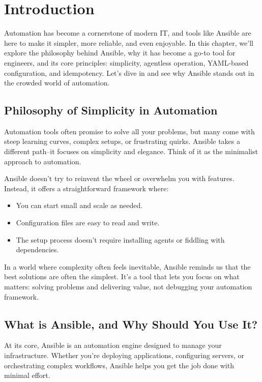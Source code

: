 \chapter{Introduction}

Automation has become a cornerstone of modern IT, and tools like Ansible are here to make it simpler, more reliable, and even enjoyable. In this chapter, we'll explore the philosophy behind Ansible, why it has become a go-to tool for engineers, and its core principles: simplicity, agentless operation, YAML-based configuration, and idempotency. Let's dive in and see why Ansible stands out in the crowded world of automation.

\section{Philosophy of Simplicity in Automation}

Automation tools often promise to solve all your problems, but many come with steep learning curves, complex setups, or frustrating quirks. Ansible takes a different path--it focuses on simplicity and elegance. Think of it as the minimalist approach to automation.

Ansible doesn't try to reinvent the wheel or overwhelm you with features. Instead, it offers a straightforward framework where:
\begin{itemize}
    \item You can start small and scale as needed.
    \item Configuration files are easy to read and write.
    \item The setup process doesn't require installing agents or fiddling with dependencies.
\end{itemize}

In a world where complexity often feels inevitable, Ansible reminds us that the best solutions are often the simplest. It's a tool that lets you focus on what matters: solving problems and delivering value, not debugging your automation framework.

\section{What is Ansible, and Why Should You Use It?}

At its core, Ansible is an automation engine designed to manage your infrastructure. Whether you're deploying applications, configuring servers, or orchestrating complex workflows, Ansible helps you get the job done with minimal effort.

